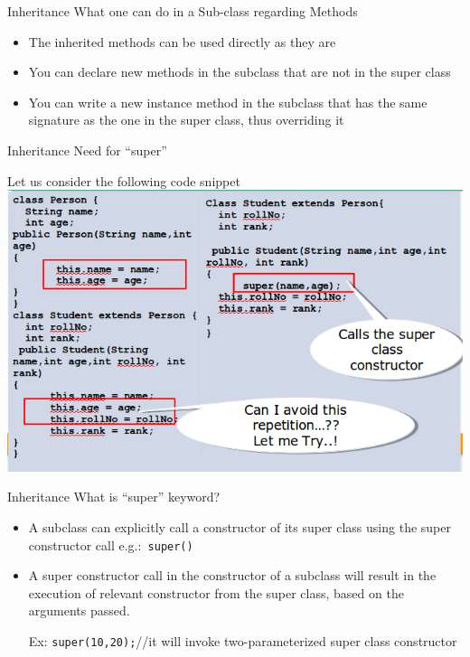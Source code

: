\documentclass[14pt]{beamer}
\begin{document}
\begin{frame}{Inheritance}
 What one can do in a Sub-class regarding Methods
 \begin{itemize}
  \item The inherited methods can be used directly as they are
  \item You can declare new methods in the subclass that are not in the super class
  \item You can write a new instance method in the subclass that has the same signature as the one in the super class, thus overriding it
 \end{itemize}

\end{frame}

\begin{frame}{Inheritance}
Need for ``super'' 

Let us consider the following  code snippet
\includegraphics[scale=.4]{need-for-super.png}
 
\end{frame}


\begin{frame}{Inheritance}
What is ``super'' keyword?
\begin{itemize}
 \item A subclass can explicitly call a constructor of its super class using the super constructor call e.g.:\lstinline! super()!

 \item A super constructor call in the constructor of a subclass will result in the execution of relevant constructor from the super class, based on the arguments passed. 

Ex: \lstinline!super(10,20);!//it will invoke two-parameterized super class constructor
\end{itemize}
\end{frame}
\end{document}
